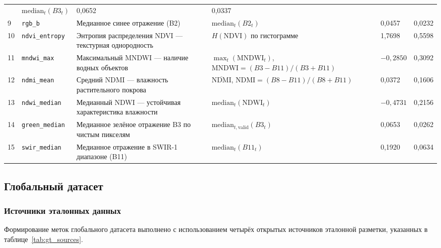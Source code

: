 \documentclass[14pt,a4paper]{extarticle}
\newcommand{\tbl}[1]{\texttt{#1}}  %
\begin{document}
\begin{landscape}
\begin{longtable}{@{}C{6mm}L{28mm}L{44mm}L{48mm}R{14mm}R{16mm}@{}}
  & $\text{median}_t(B3_t)$                                                  & 0,0652 & 0,0337 \\[3pt]
9 & \tbl{rgb\_b}             & Медианное синее отражение (B2)
  & $\text{median}_t(B2_t)$                                                  & 0,0457 & 0,0232 \\[3pt]
10& \tbl{ndvi\_entropy}      & Энтропия распределения NDVI — текстурная однородность
  & $H(\text{NDVI})$ по гистограмме                                          & 1,7698 & 0,5598 \\[3pt]
11& \tbl{mndwi\_max}         & Максимальный MNDWI — наличие водных объектов
  & $\max_t(\text{MNDWI}_t)$, $\text{MNDWI}=(B3-B11)/(B3+B11)$             & $-0,2850$ & 0,3092 \\[3pt]
12& \tbl{ndmi\_mean}         & Средний NDMI — влажность растительного покрова
  & $\overline{\text{NDMI}}$, $\text{NDMI}=(B8-B11)/(B8+B11)$              & 0,0372 & 0,1606 \\[3pt]
13& \tbl{ndwi\_median}       & Медианный NDWI — устойчивая характеристика влажности
  & $\text{median}_t(\text{NDWI}_t)$                                        & $-0,4731$ & 0,2156 \\[3pt]
14& \tbl{green\_median}      & Медианное зелёное отражение B3 по чистым пикселям
  & $\text{median}_{t,\text{valid}}(B3_t)$                                   & 0,0653 & 0,0262 \\[3pt]
15& \tbl{swir\_median}       & Медианное отражение в SWIR-1 диапазоне (B11)
  & $\text{median}_t(B11_t)$                                                 & 0,1920 & 0,0634 \\
\end{longtable}
\end{landscape}

\subsection{Глобальный датасет}

\subsubsection{Источники эталонных данных}

Формирование меток глобального датасета выполнено с использованием четырёх
открытых источников эталонной разметки, указанных в таблице~\ref{tab:gt_sources}.
\end{document}
